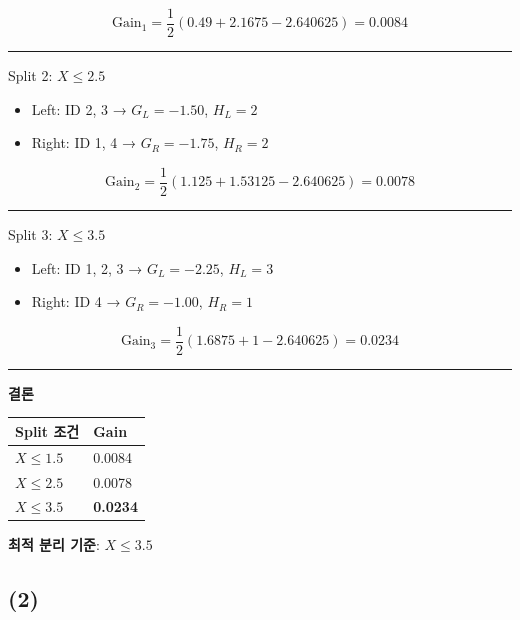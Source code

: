 \documentclass[
  a4paper,
  DIV=11,
  numbers=noendperiod]{scrreprt}
\providecommand{\tightlist}{%
  \setlength{\itemsep}{0pt}\setlength{\parskip}{0pt}}\usepackage{longtable,booktabs,array}
\begin{document}
\[
\text{Gain}_1 = \frac{1}{2} \left( 0.49 + 2.1675 - 2.640625 \right) = 0.0084
\]

\begin{center}\rule{0.5\linewidth}{0.5pt}\end{center}

Split 2: \(X \leq 2.5\)

\begin{itemize}
\tightlist
\item
  Left: ID 2, 3 → \(G_L = -1.50\), \(H_L = 2\)\\
\item
  Right: ID 1, 4 → \(G_R = -1.75\), \(H_R = 2\)
\end{itemize}

\[
\text{Gain}_2 = \frac{1}{2} \left( 1.125 + 1.53125 - 2.640625 \right) = 0.0078
\]

\begin{center}\rule{0.5\linewidth}{0.5pt}\end{center}

Split 3: \(X \leq 3.5\)

\begin{itemize}
\tightlist
\item
  Left: ID 1, 2, 3 → \(G_L = -2.25\), \(H_L = 3\)\\
\item
  Right: ID 4 → \(G_R = -1.00\), \(H_R = 1\)
\end{itemize}

\[
\text{Gain}_3 = \frac{1}{2} \left( 1.6875 + 1 - 2.640625 \right) = 0.0234
\]

\begin{center}\rule{0.5\linewidth}{0.5pt}\end{center}

\textbf{결론}

\begin{longtable}[]{@{}ll@{}}
\toprule\noalign{}
Split 조건 & Gain \\
\midrule\noalign{}
\endhead
\bottomrule\noalign{}
\endlastfoot
\(X \leq 1.5\) & 0.0084 \\
\(X \leq 2.5\) & 0.0078 \\
\(X \leq 3.5\) & \textbf{0.0234} \\
\end{longtable}

\textbf{최적 분리 기준}: \(X \leq 3.5\)

\subsection{(2)}\label{section-9}
\end{document}
